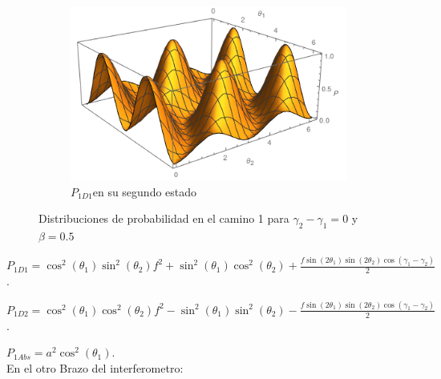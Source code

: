 \documentclass[11pt]{article}
\begin{document}
\begin{figure}[h!]
\begin{subfigure}[b]{0.40\linewidth}
\label{fig:westminster_aerea}
\end{subfigure}
\begin{subfigure}[b]{0.40\linewidth}
\includegraphics[width=\linewidth,height=3.5 cm]{p1cd12.png}
\caption{$P_{1D1} $en su segundo estado }
\label{fig:BS1}
\end{subfigure}
\caption{Distribuciones de probabilidad en el camino 1 para  $\gamma_{2}-\gamma_{1}=0 $ y $\beta=0.5$}
\label{fig:westminster}
\end{figure}

\vspace{5cm}

$P_{1D1}=\cos^2(\theta_{1})\sin^2(\theta_{2})f^2+ \sin^2(\theta_{1})\cos^2(\theta_{2})+\frac{f \sin(2\theta_{1})\sin(2\theta_{2})\cos(\gamma_{1}-\gamma_{2})}{2}$.

$P_{1D2}=\cos^2(\theta_{1})\cos^2(\theta_{2})f^2- \sin^2(\theta_{1})\sin^2(\theta_{2})-\frac{f \sin(2\theta_{1})\sin(2\theta_{2})\cos(\gamma_{1}-\gamma_{2})}{2}$.

$P_{1Abs}=a^2 \cos^2(\theta_{1})$.\\



En el otro Brazo del interferometro:
\end{document}

